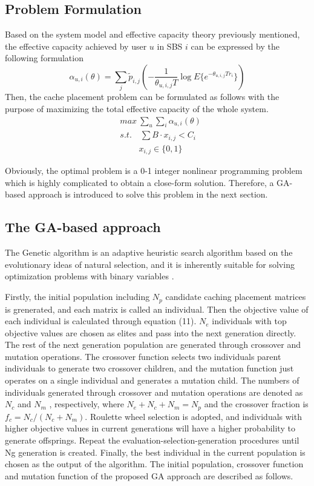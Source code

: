\documentclass[conference]{IEEEtran}
\begin{document}
\subsection{Problem Formulation}
Based on the system model and effective capacity theory previously mentioned, the effective capacity achieved by user $u$ in SBS $i$ can be expressed by the following formulation
\begin{equation}
\alpha_{u,i}(\theta)=\sum_j{\tilde{p}_{i,j}}(-\frac{1}{\theta_{u,i,j}T}\log E\{e^{-\theta_{u,i,j}Tr_i}\})
\end{equation}
Then, the cache placement problem can be formulated as follows with the purpose of maximizing the total effective capacity of the whole system.
\begin{equation}
 \begin{aligned}
   & {max}\ \sum_u\sum_i\alpha_{u,i}(\theta)\\
   & s.t. \quad\sum B\cdot x_{i,j}<C_i\\
   & \qquad \ x_{i,j}\in\{0,1\}
 \end{aligned}
\end{equation}

Obviously, the optimal problem is a 0-1 integer nonlinear programming problem which is highly complicated to obtain a close-form solution. Therefore, a GA-based approach is introduced to solve this problem in the next section.

\subsection{The GA-based approach}
The Genetic algorithm is an adaptive heuristic search algorithm based on the evolutionary ideas of natural selection, and it is inherently suitable for solving optimization problems with binary variables \cite{Srinivas2002Genetic}.

Firstly, the initial population including $N_p$ candidate caching placement matrices is grenerated, and each matrix is called an individual. Then the objective value of each individual is calculated through equation (11). $N_e$ individuals with top objective values are chosen as elites and pass into the next generation directly. The rest of the next generation population are generated through crossover and mutation operations. The crossover function selects two individuals parent individuals to generate two crossover children, and the mutation function just operates on a single individual and generates a mutation child. The numbers of individuals generated through crossover and mutation operations are denoted as $N_c$ and $N_m$ , respectively, where $N_e+N_c+N_m=N_p$ and the crossover fraction is $f_c=N_c/ (N_c+N_m)$. Roulette wheel selection is adopted, and individuals with higher objective values in current generations will have a higher probability to generate offsprings. Repeat the evaluation-selection-generation procedures until Ng generation is created. Finally, the best individual in the current population is chosen as the output of the algorithm. The initial population, crossover function and mutation function of the proposed GA approach are described as follows.
\end{document}
